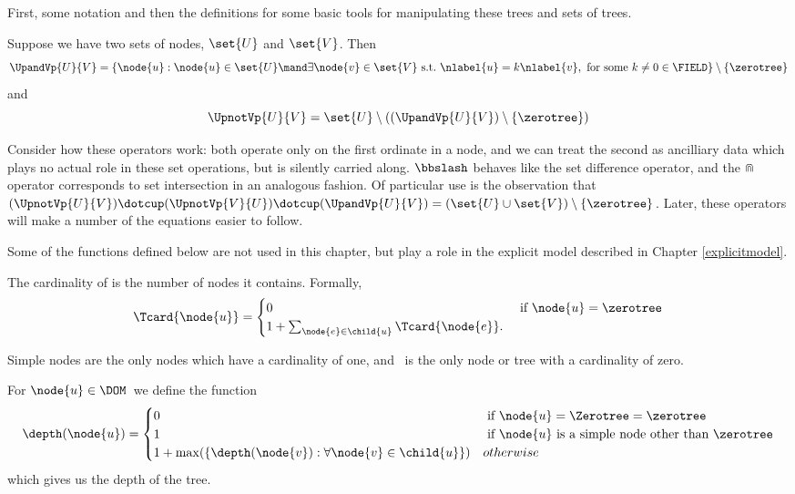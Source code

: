 First, some notation and then the definitions for some basic tools for
manipulating these trees and sets of trees.
\begin{notation}
  Suppose we have two sets of nodes, $\set{U}$ and $\set{V}$.  Then
  \[
  \UpandVp{U}{V} =
  \{\node{u}:\node{u}\in\set{U}\mand\exists\node{v}\in\set{V}~\text{s.t.}~\nlabel{u}=k\nlabel{v},
  \text{ for some } k\neq 0\in\FIELD\}\setminus\{\zerotree\}
  \]
  and
  \[
  \UpnotVp{U}{V} = \set{U}\setminus((\UpandVp{U}{V})\setminus\{\zerotree\})
  \]
\end{notation}

Consider how these operators work: both operate only on the first
ordinate in a node, and we can treat the second as ancilliary data
which plays no actual role in these set operations, but is silently
carried along.  $\bbslash$ behaves like the set difference operator,
and the $\doublecap$ operator corresponds to set intersection in an
analogous fashion.  Of particular use is the observation that
$(\UpnotVp{U}{V})\dotcup(\UpnotVp{V}{U})\dotcup(\UpandVp{U}{V}) =
(\set{U}\cup\set{V})\setminus\{\zerotree\}$. Later, these operators
will make a number of the equations easier to follow.

Some of the functions defined below are not used in this chapter, but
play a role in the explicit model described in Chapter \ref{explicitmodel}.

\begin{definition}
  The cardinality of  is the number of nodes it contains. Formally,
  \begin{align}
    \Tcard{\node{u}} = \begin{cases}
      0 & \text{ if } \node{u} = \zerotree\\
      1 + \sum_{\node{e}\in\child{u}} \Tcard{\node{e}}.
    \end{cases}
  \end{align}

  Simple nodes are the only nodes which have a cardinality of one, and \tzerotree\ is the only node or tree with a
  cardinality of zero.
\end{definition}

\begin{definition}
  For $\node{u} \in \DOM$\ we define the function
  \begin{align}
    \depth(\node{u}) = \begin{cases}
      0 & \text{ if } \node{u} = \Zerotree = \zerotree \\
      1 & \text{ if } \node{u} \text{ is a simple node other than $\zerotree$} \\
      1 + \max(\lbrace\depth(\node{v}):\forall \node{v} \in \child{u}\rbrace) & otherwise
    \end{cases}
  \end{align}
  which gives us the depth of the tree.
\end{definition}

